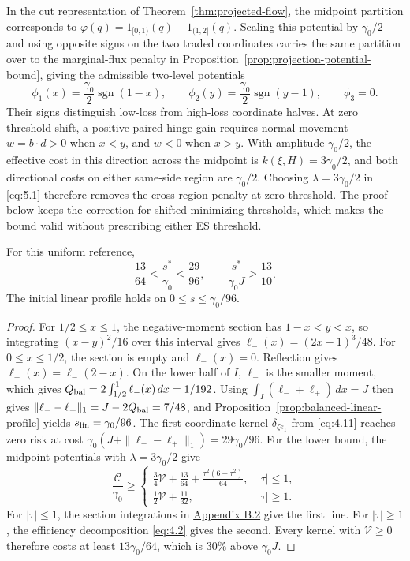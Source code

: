 In the cut representation of Theorem~\ref{thm:projected-flow}, the midpoint partition corresponds to \(\varphi(q)=1_{[0,1)}(q)-1_{(1,2]}(q)\). Scaling this potential by \(\gamma_0/2\) and using opposite signs on the two traded coordinates carries the same partition over to the marginal-flux penalty in Proposition~\ref{prop:projection-potential-bound}, giving the admissible two-level potentials
\[
\phi_1(x)=\frac{\gamma_0}{2}\operatorname{sgn}(1-x),\qquad
\phi_2(y)=\frac{\gamma_0}{2}\operatorname{sgn}(y-1),\qquad \phi_3=0.
\]
Their signs distinguish low-loss from high-loss coordinate halves. At zero threshold shift, a positive paired hinge gain requires normal movement \(w=b\cdot d>0\) when \(x<y\), and \(w<0\) when \(x>y\). With amplitude \(\gamma_0/2\), the effective cost in this direction across the midpoint is \(k(\xi,H)=3\gamma_0/2\), and both directional costs on either same-side region are \(\gamma_0/2\). Choosing \(\lambda=3\gamma_0/2\) in \eqref{eq:5.1} therefore removes the cross-region penalty at zero threshold. The proof below keeps the correction for shifted minimizing thresholds, which makes the bound valid without prescribing either ES threshold.

\begin{corollary}\label{cor:uniform-reference}
For this uniform reference,
\begin{equation}
\frac{13}{64}\le\frac{s^*}{\gamma_0}\le\frac{29}{96},
\qquad \frac{s^*}{\gamma_0J}\ge\frac{13}{10}.
\tag{5.2}\label{eq:5.2}
\end{equation}
The initial linear profile holds on \(0\le s\le\gamma_0/96\).
\end{corollary}

\begin{proof}
For \(1/2\le x\le1\), the negative-moment section has \(1-x<y<x\), so integrating \((x-y)^2/16\) over this interval gives \(\ell_-(x)=(2x-1)^3/48\). For \(0\le x\le1/2\), the section is empty and \(\ell_-(x)=0\). Reflection gives \(\ell_+(x)=\ell_-(2-x)\). On the lower half of \(I\), \(\ell_-\) is the smaller moment, which gives \(Q_{\rm bal}=2\int_{1/2}^1\ell_-(x)\,dx=1/192\). Using \(\int_I(\ell_-+\ell_+)\,dx=J\) then gives \(\|\ell_--\ell_+\|_1=J-2Q_{\rm bal}=7/48\), and Proposition~\ref{prop:balanced-linear-profile} yields \(s_{\rm lin}=\gamma_0/96\). The first-coordinate kernel \(\delta_{\zeta e_1}\) from \eqref{eq:4.11} reaches zero risk at cost \(\gamma_0(J+\|\ell_--\ell_+\|_1)=29\gamma_0/96\). For the lower bound, the midpoint potentials with \(\lambda=3\gamma_0/2\) give
\[
\frac{\mathcal C}{\gamma_0}\ge
\begin{cases}
\displaystyle \frac34\mathcal V+\frac{13}{64}
+\frac{\tau^2(6-\tau^2)}{64},& |\tau|\le1,\\[2pt]
\displaystyle \frac12\mathcal V+\frac{11}{32},& |\tau|\ge1.
\end{cases}
\]
For \(|\tau|\le1\), the section integrations in \hyperref[app:uniform-bound-proof]{Appendix B.2} give the first line. For \(|\tau|\ge1\), the efficiency decomposition \eqref{eq:4.2} gives the second. Every kernel with \(\mathcal V\ge0\) therefore costs at least \(13\gamma_0/64\), which is \(30\%\) above \(\gamma_0J\).
\end{proof}

